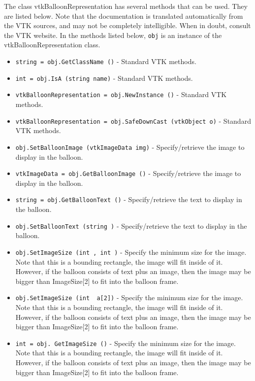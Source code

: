 The class vtkBalloonRepresentation has several methods that can be used.
  They are listed below.
Note that the documentation is translated automatically from the VTK sources,
and may not be completely intelligible.  When in doubt, consult the VTK website.
In the methods listed below, \verb|obj| is an instance of the vtkBalloonRepresentation class.
\begin{itemize}
\item  \verb|string = obj.GetClassName ()| -  Standard VTK methods.

\item  \verb|int = obj.IsA (string name)| -  Standard VTK methods.

\item  \verb|vtkBalloonRepresentation = obj.NewInstance ()| -  Standard VTK methods.

\item  \verb|vtkBalloonRepresentation = obj.SafeDownCast (vtkObject o)| -  Standard VTK methods.

\item  \verb|obj.SetBalloonImage (vtkImageData img)| -  Specify/retrieve the image to display in the balloon.

\item  \verb|vtkImageData = obj.GetBalloonImage ()| -  Specify/retrieve the image to display in the balloon.

\item  \verb|string = obj.GetBalloonText ()| -  Specify/retrieve the text to display in the balloon.

\item  \verb|obj.SetBalloonText (string )| -  Specify/retrieve the text to display in the balloon.

\item  \verb|obj.SetImageSize (int , int )| -  Specify the minimum size for the image. Note that this is a bounding
 rectangle, the image will fit inside of it. However, if the balloon
 consists of text plus an image, then the image may be bigger than
 ImageSize[2] to fit into the balloon frame.

\item  \verb|obj.SetImageSize (int  a[2])| -  Specify the minimum size for the image. Note that this is a bounding
 rectangle, the image will fit inside of it. However, if the balloon
 consists of text plus an image, then the image may be bigger than
 ImageSize[2] to fit into the balloon frame.

\item  \verb|int = obj. GetImageSize ()| -  Specify the minimum size for the image. Note that this is a bounding
 rectangle, the image will fit inside of it. However, if the balloon
 consists of text plus an image, then the image may be bigger than
 ImageSize[2] to fit into the balloon frame.


\end{itemize}
